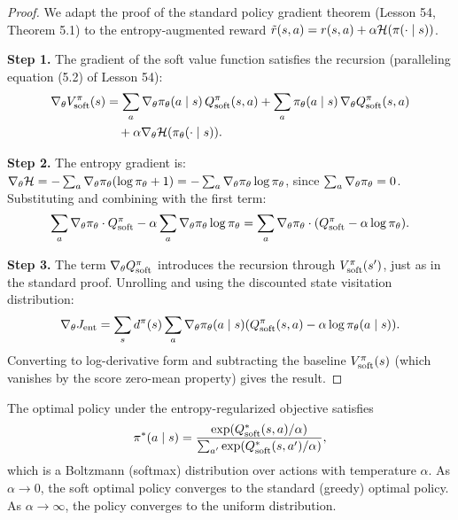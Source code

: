 \documentclass[11pt,a4paper]{article}
\begin{document}
\begin{proof}
We adapt the proof of the standard policy gradient theorem (Lesson 54,
Theorem 5.1) to the entropy-augmented reward
$\tilde{r}(s,a) = r(s,a) + \alpha \mathcal{H}(\pi(\cdot \mid s))$.

\textbf{Step 1.} The gradient of the soft value function satisfies
the recursion (paralleling equation (5.2) of Lesson 54):
\begin{align*}
  \nabla_\theta V^{\pi}_{\mathrm{soft}}(s)
  &= \sum_a \nabla_\theta \pi_\theta(a \mid s)\,
    Q^{\pi}_{\mathrm{soft}}(s,a)
  + \sum_a \pi_\theta(a \mid s)\, \nabla_\theta
    Q^{\pi}_{\mathrm{soft}}(s,a) \\
  &\quad + \alpha \nabla_\theta \mathcal{H}(\pi_\theta(\cdot \mid s)).
\end{align*}

\textbf{Step 2.} The entropy gradient is:
$\nabla_\theta \mathcal{H} = -\sum_a \nabla_\theta \pi_\theta
(\log \pi_\theta + 1) = -\sum_a \nabla_\theta \pi_\theta
\log \pi_\theta$, since $\sum_a \nabla_\theta \pi_\theta = 0$.
Substituting and combining with the first term:
\[
  \sum_a \nabla_\theta \pi_\theta \cdot Q^{\pi}_{\mathrm{soft}}
  - \alpha \sum_a \nabla_\theta \pi_\theta \log \pi_\theta
  = \sum_a \nabla_\theta \pi_\theta \cdot
  (Q^{\pi}_{\mathrm{soft}} - \alpha \log \pi_\theta).
\]

\textbf{Step 3.} The term $\nabla_\theta Q^{\pi}_{\mathrm{soft}}$
introduces the recursion through $V^{\pi}_{\mathrm{soft}}(s')$,
just as in the standard proof. Unrolling and using the discounted
state visitation distribution:
\[
  \nabla_\theta J_{\mathrm{ent}} = \sum_s d^{\pi}(s) \sum_a
  \nabla_\theta \pi_\theta(a \mid s)
  (Q^{\pi}_{\mathrm{soft}}(s,a) - \alpha \log \pi_\theta(a \mid s)).
\]
Converting to log-derivative form and subtracting the baseline
$V^{\pi}_{\mathrm{soft}}(s)$ (which vanishes by the score
zero-mean property) gives the result.
\end{proof}

\begin{keyresult}[title={Soft Optimal Policy}]
The optimal policy under the entropy-regularized objective satisfies
\[
  \pi^*(a \mid s) = \frac{\exp(Q^*_{\mathrm{soft}}(s,a) / \alpha)}
  {\sum_{a'} \exp(Q^*_{\mathrm{soft}}(s,a') / \alpha)},
\]
which is a Boltzmann (softmax) distribution over actions with
temperature $\alpha$. As $\alpha \to 0$, the soft optimal policy
converges to the standard (greedy) optimal policy. As $\alpha \to
\infty$, the policy converges to the uniform distribution.
\end{keyresult}
\end{document}
